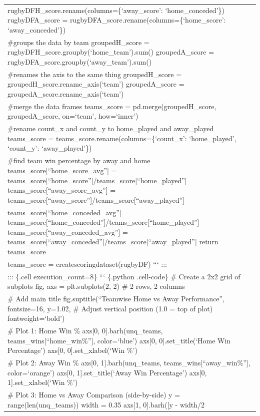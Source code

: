\documentclass[
  letterpaper,
  DIV=11,
  numbers=noendperiod]{scrartcl}
\begin{document}
\begin{longtable}[]{@{}
  >{\raggedright\arraybackslash}p{}@{}}
rugbyDFH\_score.rename(columns=\{`away\_score': `home\_conceded'\})
rugbyDFA\_score = rugbyDFA\_score.rename(columns=\{`home\_score':
`away\_conceded'\}) \\
\#groups the data by team groupedH\_score =
rugbyDFH\_score.groupby(`home\_team').sum() groupedA\_score =
rugbyDFA\_score.groupby(`away\_team').sum() \\
\#renames the axis to the same thing groupedH\_score =
groupedH\_score.rename\_axis(`team') groupedA\_score =
groupedA\_score.rename\_axis(`team') \\
\#merge the data frames teams\_score = pd.merge(groupedH\_score,
groupedA\_score, on=`team', how=`inner') \\
\#rename count\_x and count\_y to home\_played and away\_played
teams\_score = teams\_score.rename(columns=\{`count\_x': `home\_played',
`count\_y': `away\_played'\}) \\
\#find team win percentage by away and home
teams\_score{[}``home\_score\_avg''{]} =
teams\_score{[}``home\_score''{]}/teams\_score{[}``home\_played''{]}
teams\_score{[}``away\_score\_avg''{]} =
teams\_score{[}``away\_score''{]}/teams\_score{[}``away\_played''{]} \\
teams\_score{[}``home\_conceded\_avg''{]} =
teams\_score{[}``home\_conceded''{]}/teams\_score{[}``home\_played''{]}
teams\_score{[}``away\_conceded\_avg''{]} =
teams\_score{[}``away\_conceded''{]}/teams\_score{[}``away\_played''{]}
return teams\_score \\
teams\_score = createscoringdataset(rugbyDF) ``` ::: \\
::: \{.cell execution\_count=8\} ``` \{.python .cell-code\} \# Create a
2x2 grid of subplots fig, axs = plt.subplots(2, 2) \# 2 rows, 2
columns \\
\# Add main title fig.suptitle(``Teamwise Home vs Away Performance'',
fontsize=16, y=1.02, \# Adjust vertical position (1.0 = top of plot)
fontweight=`bold') \\
\# Plot 1: Home Win \% axs{[}0, 0{]}.barh(unq\_teams,
teams\_wins{[}``home\_win\%''{]}, color=`blue') axs{[}0,
0{]}.set\_title(`Home Win Percentage') axs{[}0, 0{]}.set\_xlabel(`Win
\%') \\
\# Plot 2: Away Win \% axs{[}0, 1{]}.barh(unq\_teams,
teams\_wins{[}``away\_win\%''{]}, color=`orange') axs{[}0,
1{]}.set\_title(`Away Win Percentage') axs{[}0, 1{]}.set\_xlabel(`Win
\%') \\
\# Plot 3: Home vs Away Comparison (side-by-side) y =
range(len(unq\_teams)) width = 0.35 axs{[}1, 0{]}.barh({[}y - width/2

\end{longtable}
\end{document}
